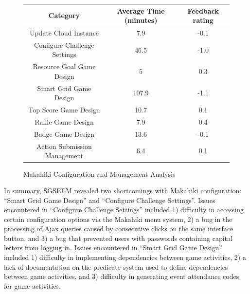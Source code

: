 \documentclass{sigchi}
\newcommand\tabhead[1]{\small\textbf{#1}}
\begin{document}
\begin{figure}[ht!]
  \centering
  \begin{tabular}{|c|c|c|}
    \hline
    \multicolumn{1}{|p{0.5\columnwidth}|}{\centering\tabhead{Category}} &
    \multicolumn{1}{|p{0.2\columnwidth}|}{\centering\tabhead{Average Time (minutes)}} &
    \multicolumn{1}{|p{0.2\columnwidth}|}{\centering\tabhead{Feedback rating}} \\
    \hline
    \multicolumn{1}{|p{0.5\columnwidth}|}{Update Cloud Instance} &
    \multicolumn{1}{|p{0.2\columnwidth}|}{7.9} &
    \multicolumn{1}{|p{0.2\columnwidth}|}{-0.1} \\
    \hline
    \multicolumn{1}{|p{0.5\columnwidth}|}{Configure Challenge Settings} &
    \multicolumn{1}{|p{0.2\columnwidth}|}{46.5} &
    \multicolumn{1}{|p{0.2\columnwidth}|}{-1.0} \\
    \hline
    \multicolumn{1}{|p{0.5\columnwidth}|}{Resource Goal Game Design} &
    \multicolumn{1}{|p{0.2\columnwidth}|}{5} &
    \multicolumn{1}{|p{0.2\columnwidth}|}{0.3} \\
    \hline
    \multicolumn{1}{|p{0.5\columnwidth}|}{Smart Grid Game Design} &
    \multicolumn{1}{|p{0.2\columnwidth}|}{107.9} &
    \multicolumn{1}{|p{0.2\columnwidth}|}{-1.1} \\
    \hline
    \multicolumn{1}{|p{0.5\columnwidth}|}{Top Score Game Design} &
    \multicolumn{1}{|p{0.2\columnwidth}|}{10.7} &
    \multicolumn{1}{|p{0.2\columnwidth}|}{0.1} \\
    \hline
    \multicolumn{1}{|p{0.5\columnwidth}|}{Raffle Game Design} &
    \multicolumn{1}{|p{0.2\columnwidth}|}{7.9} &
    \multicolumn{1}{|p{0.2\columnwidth}|}{0.4} \\
    \hline
    \multicolumn{1}{|p{0.5\columnwidth}|}{Badge Game Design} &
    \multicolumn{1}{|p{0.2\columnwidth}|}{13.6} &
    \multicolumn{1}{|p{0.2\columnwidth}|}{-0.1} \\
    \hline
    \multicolumn{1}{|p{0.5\columnwidth}|}{Action Submission Management} &
    \multicolumn{1}{|p{0.2\columnwidth}|}{6.4} &
    \multicolumn{1}{|p{0.2\columnwidth}|}{0.1} \\
    \hline
  \end{tabular}
  \caption{Makahiki Configuration and Management Analysis}
  \label{fig:makahiki-configuration-management}
\end{figure}

In summary, SGSEEM revealed two shortcomings with Makahiki configuration: ``Smart
Grid Game Design'' and ``Configure Challenge Settings''. Issues encountered in ``Configure
Challenge Settings'' included 1) difficulty in accessing certain configuration options via
the Makahiki menu system, 2) a bug in the processing of Ajax queries caused by consecutive
clicks on the same interface button, and 3) a bug that prevented users with passwords
containing capital letters from logging in. Issues encountered in ``Smart Grid Game
Design'' included 1) difficulty in implementing dependencies between game activities, 2) a
lack of documentation on the predicate system used to define dependencies between game
activities, and 3) difficulty in generating event attendance codes for game activities.
\end{document}
